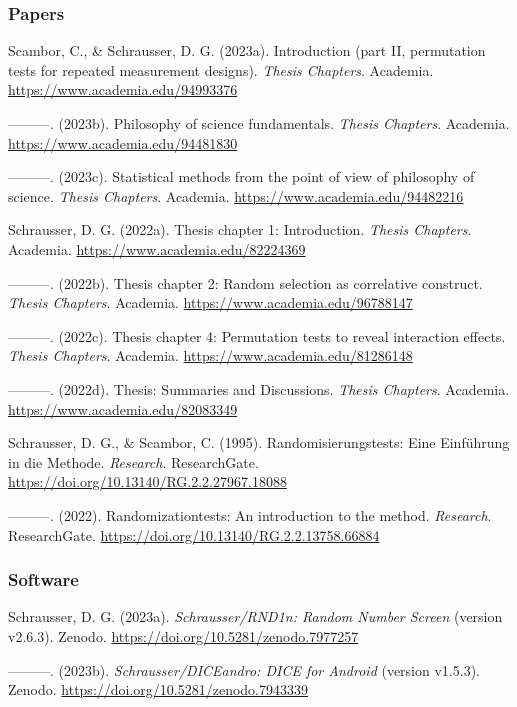 \documentclass[
]{article}
\begin{document}
\hypertarget{papers-1}{%
\subsubsection{Papers}\label{papers-1}}

Scambor, C., \& Schrausser, D. G. (2023a). Introduction (part II,
permutation tests for repeated measurement designs). \emph{Thesis
Chapters}. Academia. \url{https://www.academia.edu/94993376}

---------. (2023b). Philosophy of science fundamentals. \emph{Thesis
Chapters}. Academia. \url{https://www.academia.edu/94481830}

---------. (2023c). Statistical methods from the point of view of
philosophy of science. \emph{Thesis Chapters}. Academia.
\url{https://www.academia.edu/94482216}

Schrausser, D. G. (2022a). Thesis chapter 1: Introduction. \emph{Thesis
Chapters}. Academia. \url{https://www.academia.edu/82224369}

---------. (2022b). Thesis chapter 2: Random selection as correlative
construct. \emph{Thesis Chapters}. Academia.
\url{https://www.academia.edu/96788147}

---------. (2022c). Thesis chapter 4: Permutation tests to reveal
interaction effects. \emph{Thesis Chapters}. Academia.
\url{https://www.academia.edu/81286148}

---------. (2022d). Thesis: Summaries and Discussions. \emph{Thesis
Chapters}. Academia. \url{https://www.academia.edu/82083349}

Schrausser, D. G., \& Scambor, C. (1995). Randomisierungstests: Eine
Einführung in die Methode. \emph{Research}. ResearchGate.
\url{https://doi.org/10.13140/RG.2.2.27967.18088}

---------. (2022). Randomizationtests: An introduction to the method.
\emph{Research}. ResearchGate.
\url{https://doi.org/10.13140/RG.2.2.13758.66884}

\hypertarget{software-1}{%
\subsubsection{Software}\label{software-1}}

Schrausser, D. G. (2023a). \emph{Schrausser/RND1n: Random Number Screen}
(version v2.6.3). Zenodo. \url{https://doi.org/10.5281/zenodo.7977257}

---------. (2023b). \emph{Schrausser/DICEandro: DICE for Android}
(version v1.5.3). Zenodo. \url{https://doi.org/10.5281/zenodo.7943339}
\end{document}
